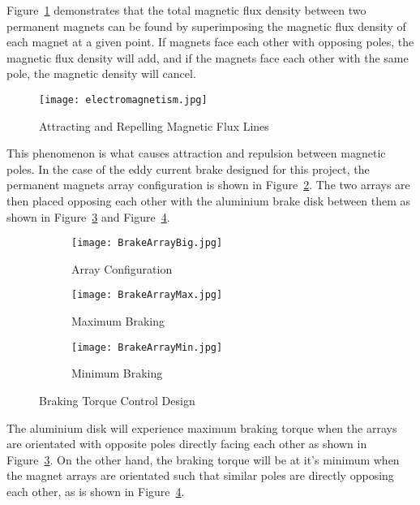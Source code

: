 Figure~\ref{fig:Electro} demonstrates that the total magnetic flux density between two permanent magnets can be found by superimposing the magnetic flux density of each magnet at a given point. If magnets face each other with opposing poles, the magnetic flux density will add, and if the magnets face each other with the same pole, the magnetic density will cancel.

\begin{figure}[H]
	\centering
	\texttt{[image: electromagnetism.jpg]}
	\caption{Attracting and Repelling Magnetic Flux Lines}
	\label{fig:Electro}
	\citep[2022]{electronics:2022}
\end{figure}

This phenomenon is what causes attraction and repulsion between magnetic poles. In the case of the eddy current brake designed for this project, the permanent magnets array configuration is shown in Figure~\ref{fig:MagsA}. The two arrays are then placed opposing each other with the aluminium brake disk between them as shown in Figure~\ref{fig:maxMags} and Figure~\ref{fig:minMags}.

\begin{figure}[H]
	\centering
		\begin{subfigure}{.3\textwidth}
		\centering
		\texttt{[image: BrakeArrayBig.jpg]}
		\caption{Array Configuration}
		\label{fig:MagsA}
	\end{subfigure}%
	\hfill
	\begin{subfigure}{.3\textwidth}
		\centering
		\texttt{[image: BrakeArrayMax.jpg]}
		\caption{Maximum Braking}
		\label{fig:maxMags}
	\end{subfigure}%
	\hfill
	\begin{subfigure}{.3\textwidth}
		\centering
		\texttt{[image: BrakeArrayMin.jpg]}
		\caption{Minimum Braking}
		\label{fig:minMags}
	\end{subfigure}
	\caption{Braking Torque Control Design}
	\label{fig:magarrays}
\end{figure}

\vspace*{-0.5cm}

The aluminium disk will experience maximum braking torque when the arrays are orientated with opposite poles directly facing each other as shown in Figure~\ref{fig:maxMags}. On the other hand, the braking torque will be at it's minimum when the magnet arrays are orientated such that similar poles are directly opposing each other, as is shown in Figure~\ref{fig:minMags}.

